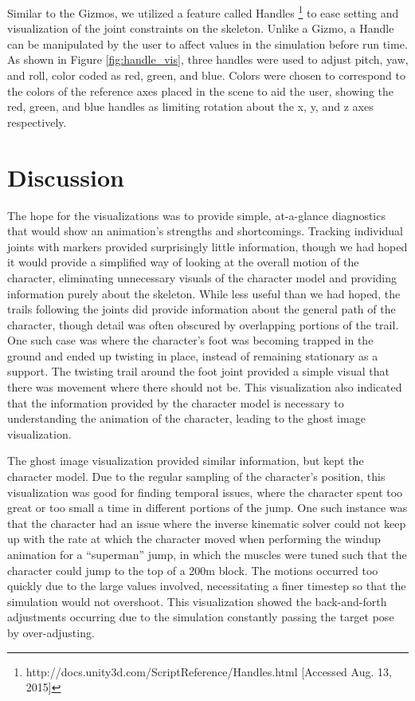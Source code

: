 Similar to the Gizmos, we utilized a feature called Handles \footnote{http://docs.unity3d.com/ScriptReference/Handles.html [Accessed Aug. 13, 2015]} to ease setting and visualization of the joint constraints on the skeleton.  Unlike a Gizmo, a Handle can be manipulated by the user to affect values in the simulation before run time.  As shown in Figure \ref{fig:handle_vis}, three handles were used to adjust pitch, yaw, and roll, color coded as red, green, and blue.  Colors were chosen to correspond to the colors of the reference axes placed in the scene to aid the user, showing the red, green, and blue handles as limiting rotation about the x, y, and z axes respectively.

\section{Discussion}
\label{section:vis_discussion}
The hope for the visualizations was to provide simple, at-a-glance diagnostics that would show an animation's strengths and shortcomings.  Tracking individual joints with markers provided surprisingly little information, though we had hoped it would provide a simplified way of looking at the overall motion of the character, eliminating unnecessary visuals of the character model and providing information purely about the skeleton.  While less useful than we had hoped, the trails following the joints did provide information about the general path of the character, though detail was often obscured by overlapping portions of the trail. One such case was where the character's foot was becoming trapped in the ground and ended up twisting in place, instead of remaining stationary as a support.  The twisting trail around the foot joint provided a simple visual that there was movement where there should not be.  This visualization also indicated that the information provided by the character model is necessary to understanding the animation of the character, leading to the ghost image visualization.

The ghost image visualization provided similar information, but kept the character model.   Due to the regular sampling of the character's position, this visualization was good for finding temporal issues, where the character spent too great or too small a time in different portions of the jump.  One such instance was that the character had an issue where the inverse kinematic solver could not keep up with the rate at which the character moved when performing the windup animation for a ``superman'' jump, in which the muscles were tuned such that the character could jump to the top of a 200m block.  The motions occurred too quickly due to the large values involved, necessitating a finer timestep so that the simulation would not overshoot.  This visualization showed the back-and-forth adjustments occurring due to the simulation constantly passing the target pose by over-adjusting.

